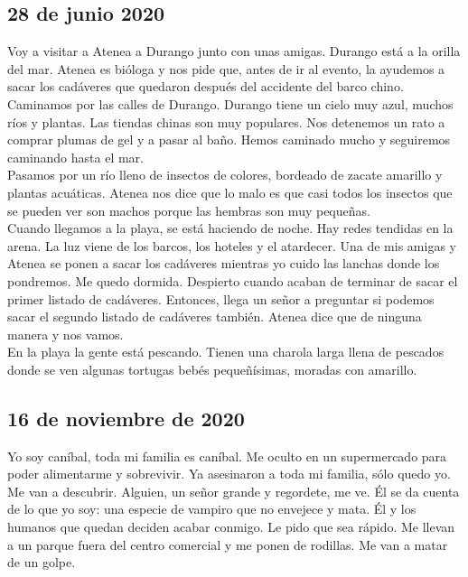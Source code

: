 \documentclass[12pt]{book}
\begin{document}
\subsection*{\hfill 28 de junio 2020}
Voy a visitar a Atenea a Durango junto con unas amigas. Durango está a la orilla del mar. Atenea es bióloga y nos pide que, antes de ir al evento, la ayudemos a sacar los cadáveres que quedaron después del accidente del barco chino. Caminamos por las calles de Durango. 
Durango tiene un cielo muy azul, muchos ríos y plantas. Las tiendas chinas son muy populares. Nos detenemos un rato a comprar plumas de gel y a pasar al baño.  Hemos caminado mucho y seguiremos caminando hasta el mar.\\
Pasamos por un río lleno de insectos de colores, bordeado de zacate amarillo y plantas acuáticas. Atenea nos dice que lo malo es que casi todos los insectos que se pueden ver son machos porque las hembras son muy pequeñas. \\
Cuando llegamos a la playa, se está haciendo de noche. Hay redes tendidas en la arena. La luz viene de los barcos, los hoteles y el atardecer. Una de mis amigas y Atenea se ponen a sacar los cadáveres mientras yo cuido las lanchas donde los pondremos. Me quedo dormida. Despierto cuando acaban de terminar de sacar el primer listado de cadáveres. Entonces, llega un señor a preguntar si podemos sacar el segundo listado de cadáveres también. Atenea dice que de ninguna manera y nos vamos. \\
En la playa la gente está pescando. Tienen una charola larga llena de pescados donde se ven algunas tortugas bebés pequeñísimas, moradas con amarillo.


\subsection*{\hfill 16 de noviembre de 2020}
Yo soy caníbal, toda mi familia es caníbal. Me oculto en un supermercado para poder alimentarme y sobrevivir. Ya asesinaron a toda mi familia, sólo quedo yo. Me van a descubrir. Alguien, un señor grande y regordete, me ve. Él se da cuenta de lo que yo soy: una especie de vampiro que no envejece y mata. Él y los humanos que quedan deciden acabar conmigo. Le pido que sea rápido. 
Me llevan a un parque fuera del centro comercial y me ponen de rodillas. Me van a matar de un golpe.  
\end{document}
